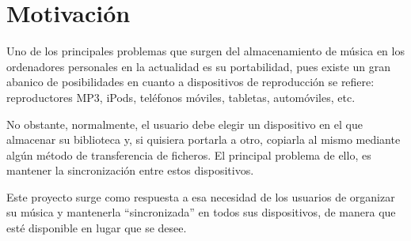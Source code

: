 \section{Motivación}

Uno de los principales problemas que surgen del almacenamiento de música en los ordenadores personales en la actualidad es su portabilidad, pues existe un gran abanico de posibilidades en cuanto a dispositivos de reproducción se refiere: reproductores MP3, iPods, teléfonos móviles, tabletas, automóviles, etc. 

No obstante, normalmente, el usuario debe elegir un dispositivo en el que almacenar su biblioteca y, si quisiera portarla a otro, copiarla al mismo mediante algún método de transferencia de ficheros. El principal problema de ello, es mantener la sincronización entre estos dispositivos.

Este proyecto surge como respuesta a esa necesidad de los usuarios de organizar su música y mantenerla ``sincronizada'' en todos sus dispositivos, de manera que esté disponible en lugar que se desee.

